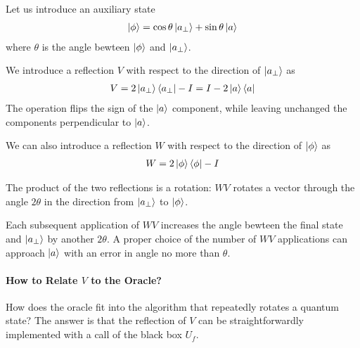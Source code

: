 Let us introduce an auxiliary state
\begin{align*}
    \ket{\phi}=\cos\theta\ket{a_\perp}+\sin\theta\ket{a}
\end{align*}
where $\theta$ is the angle bewteen $\ket{\phi}$ and $\ket{a_\perp}$. 

\begin{figure}[H]
    \centering
\end{figure}

We introduce a reflection $V$ with respect to the direction of $\ket{a_\perp}$ as
\begin{align*}
    V=2\ket{a_\perp}\bra{a_\perp}-I=I-2\ket{a}\bra{a}
\end{align*}
The operation flips the sign of the $\ket{a}$ component, while leaving unchanged the components perpendicular to $\ket{a}$. 

We can also introduce a reflection $W$ with respect to the direction of $\ket{\phi}$ as
\begin{align*}
    W=2\ket{\phi}\bra{\phi}-I
\end{align*}

The product of the two reflections is a rotation: $WV$ rotates a vector through the angle $2\theta$ in the direction from $\ket{a_\perp}$ to $\ket{\phi}$. 

Each subsequent application of $WV$ increases the angle bewteen the final state and $\ket{a_\perp}$ by another $2\theta$. A proper choice of the number of $WV$ applications can approach $\ket{a}$ with an error in angle no more than $\theta$. 

\paragraph{How to Relate \texorpdfstring{$V$}. to the Oracle?}
How does the oracle fit into the algorithm that repeatedly rotates a quantum state? The answer is that the reflection of $V$ can be straightforwardly implemented with a call of the black box $U_f$.

